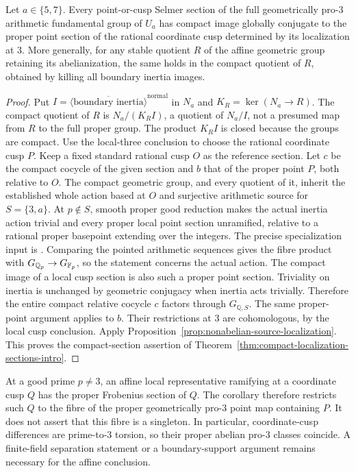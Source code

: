 \begin{corollary}\label{cor:compact-full-base-five-seven}
Let $a\in\{5,7\}$. Every point-or-cusp Selmer section of the full
geometrically pro-$3$ arithmetic fundamental group of $U_a$ has
compact image globally conjugate to the proper point section of the
rational coordinate cusp determined by its localization at $3$.
More generally, for any stable quotient $R$ of the affine geometric
group retaining its abelianization, the same holds in the compact
quotient of $R$, obtained by killing all boundary inertia images.
\end{corollary}
\begin{proof}
Put $I=\overline{\langle\text{boundary inertia}\rangle}^{\mathrm{normal}}$
in $N_a$ and $K_R=\ker(N_a\to R)$. The compact quotient of $R$ is
$N_a/(K_RI)$, a quotient of $N_a/I$, not a presumed map from $R$
to the full proper group. The product $K_RI$ is closed because the
groups are compact.
Use the local-three conclusion to choose the rational coordinate cusp
$P$. Keep a fixed standard rational cusp $O$ as the reference section.
Let $c$ be the compact cocycle of the given section and $b$ that of
the proper point $P$, both relative to $O$. The compact geometric
group, and every quotient of it, inherit the established whole action
based at $O$ and surjective arithmetic source for
$S=\{3,a\}$. At $p\notin S$, smooth proper good reduction makes the
actual inertia action trivial and every proper local point section
unramified, relative to a rational proper basepoint extending over the
integers. The precise specialization input is
\citet[Expos\'e X, Theorem~3.8 and Corollary~3.9, corrected p.~217]{SGA1}.
Comparing the pointed arithmetic sequences gives the fibre product with
$G_{\mathbb Q_p}\to G_{\mathbb F_p}$, so the statement concerns the actual action. The compact image of a local cusp section is also such a
proper point section. Triviality on inertia is unchanged by geometric
conjugacy when inertia acts trivially. Therefore the entire compact
relative cocycle $c$ factors through $G_{\mathbb Q,S}$. The same
proper-point argument applies to $b$. Their restrictions at $3$ are
cohomologous, by the local cusp conclusion. Apply Proposition~\ref{prop:nonabelian-source-localization}. This proves the compact-section assertion of Theorem~\ref{thm:compact-localization-sections-intro}.
\end{proof}

\begin{remark}\label{rem:compact-cusp-frobenius-fibre}
At a good prime $p\ne3$, an affine local representative ramifying at a
coordinate cusp $Q$ has the proper Frobenius section of $Q$.
The corollary therefore restricts such $Q$ to the fibre of the proper
geometrically pro-$3$ point map containing $P$.
It does not assert that this fibre is a singleton. In particular,
coordinate-cusp differences are prime-to-$3$ torsion, so their
proper abelian pro-$3$ classes coincide. A finite-field separation
statement or a boundary-support argument remains necessary for the
affine conclusion.
\end{remark}
